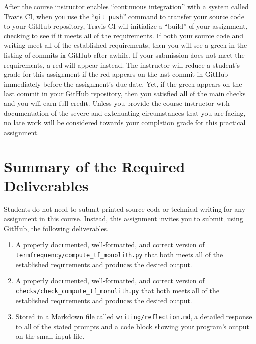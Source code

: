 \documentclass[11pt]{article}
\newcommand{\mainprogramsource}{\lstinline{termfrequency/compute_tf_monolith.py}}
\newcommand{\checkprogramsource}{\lstinline{checks/check_compute_tf_monolith.py}}
\newcommand{\reflection}{\lstinline{writing/reflection.md}}
\newcommand{\gitpush}{\command{git push}}
\newcommand{\command}[1]{``\lstinline{#1}''}
\newcommand{\step}[1]{``{#1}''}
\newcommand{\checkmark}{\ding{51}}
\newcommand{\naughtmark}{\ding{55}}
\begin{document}

After the course instructor enables \step{continuous integration} with a system
called Travis CI, when you use the \gitpush{} command to transfer your source
code to your GitHub repository, Travis CI will initialize a \step{build} of your
assignment, checking to see if it meets all of the requirements. If both your
source code and writing meet all of the established requirements, then you will
see a green \checkmark{} in the listing of commits in GitHub after awhile. If
your submission does not meet the requirements, a red \naughtmark{} will appear
instead. The instructor will reduce a student's grade for this assignment if the
red \naughtmark{} appears on the last commit in GitHub immediately before the
assignment's due date. Yet, if the green \checkmark{} appears on the last commit
in your GitHub repository, then you satisfied all of the main checks and you
will earn full credit. Unless you provide the course instructor with
documentation of the severe and extenuating circumstances that you are facing,
no late work will be considered towards your completion grade for this practical
assignment.

\section*{Summary of the Required Deliverables}

\noindent Students do not need to submit printed source code or technical
writing for any assignment in this course. Instead, this assignment invites you
to submit, using GitHub, the following deliverables.


\begin{enumerate}

\setlength{\itemsep}{0in}

\item A properly documented, well-formatted, and correct version of
  \mainprogramsource{} that both meets all of the established requirements and
  produces the desired output.

\item A properly documented, well-formatted, and correct version of
  \checkprogramsource{} that both meets all of the established requirements and
  produces the desired output.

\item Stored in a Markdown file called \reflection{}, a detailed response to all
  of the stated prompts and a code block showing your program's output on the
  small input file.

\end{enumerate}
\end{document}
